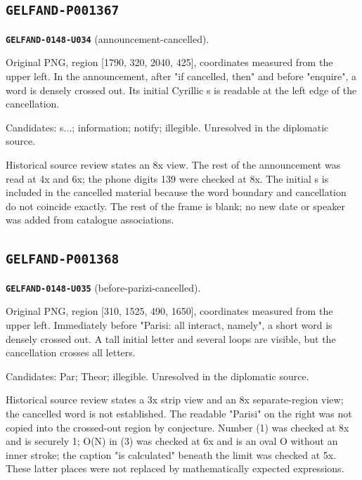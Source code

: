 \documentclass[11pt]{article}
\theoremstyle{definition}
\theoremstyle{remark}
\begin{document}
\subsection*{\texttt{GELFAND-P001367}}
\noindent\leavevmode{}\label{GELFAND-P001367:announcement-cancelled:note}\textbf{\texttt{GELFAND-0148-U034}} (announcement-cancelled).\par\nopagebreak[4]
Original PNG, region [1790, 320, 2040, 425], coordinates measured from the upper left. In the announcement, after "if cancelled, then" and before "enquire", a word is densely crossed out. Its initial Cyrillic s is readable at the left edge of the cancellation.\par
Candidates: s...; information; notify; illegible. Unresolved in the diplomatic source.\par
Historical source review states an 8x view. The rest of the announcement was read at 4x and 6x; the phone digits 139 were checked at 8x. The initial s is included in the cancelled material because the word boundary and cancellation do not coincide exactly. The rest of the frame is blank; no new date or speaker was added from catalogue associations.\par\medskip

\subsection*{\texttt{GELFAND-P001368}}
\noindent\leavevmode{}\label{GELFAND-P001368:before-parizi-cancelled:note}\textbf{\texttt{GELFAND-0148-U035}} (before-parizi-cancelled).\par\nopagebreak[4]
Original PNG, region [310, 1525, 490, 1650], coordinates measured from the upper left. Immediately before "Parisi: all interact, namely", a short word is densely crossed out. A tall initial letter and several loops are visible, but the cancellation crosses all letters.\par
Candidates: Par; Theor; illegible. Unresolved in the diplomatic source.\par
Historical source review states a 3x strip view and an 8x separate-region view; the cancelled word is not established. The readable "Parisi" on the right was not copied into the crossed-out region by conjecture. Number (1) was checked at 8x and is securely 1; O(N) in (3) was checked at 6x and is an oval O without an inner stroke; the caption "is calculated" beneath the limit was checked at 5x. These latter places were not replaced by mathematically expected expressions.\par\medskip
\end{document}
